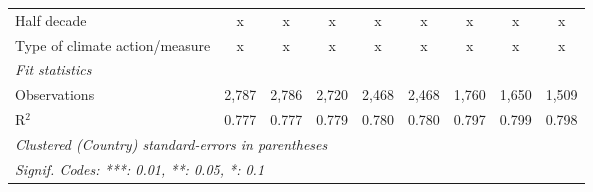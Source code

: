 \begin{tabular}{lcccccccc}
   Half decade                                               & x              & x              & x              & x              & x              & x              & x              & x\\  
   Type of climate action/measure                            & x              & x              & x              & x              & x              & x              & x              & x\\  
   \midrule \emph{Fit statistics}\\
   Observations                                              & 2,787          & 2,786          & 2,720          & 2,468          & 2,468          & 1,760          & 1,650          & 1,509\\  
   R$^2$                                                     & 0.777          & 0.777          & 0.779          & 0.780          & 0.780          & 0.797          & 0.799          & 0.798\\  
   \midrule
   \multicolumn{9}{l}{\emph{Clustered (Country) standard-errors in parentheses}}\\
   \multicolumn{9}{l}{\emph{Signif. Codes: ***: 0.01, **: 0.05, *: 0.1}}\\
\end{tabular}
\par\endgroup



